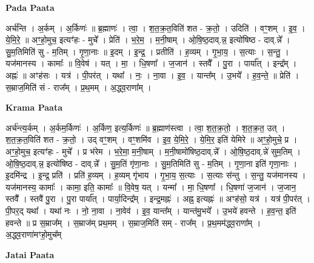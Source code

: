 \documentclass[17pt]{extarticle}
\begin{document}
\textbf{Pada Paata} \newline

अर्च॑न्ति । अ॒र्कम् । अ॒र्किणः॑ ॥ ब्र॒ह्माणः॑ । त्वा॒ । श॒त॒क्र॒त॒विति॑ शत - क्र॒तो॒ । उदिति॑ । वꣳ॒॒शम् । इ॒व॒ । ये॒मि॒रे॒ ॥ अꣳ॒॒हो॒मुच॒ इत्यꣳ॑हः - मुचे᳚ । प्रेति॑ । भ॒रे॒म॒ । म॒नी॒षाम् । ओ॒षि॒ष्ठ॒दाव्.न्न॒ इत्यो॑षिष्ठ - दाव्.न्ने᳚ । सु॒म॒तिमिति॑ सु - म॒तिम् । गृ॒णा॒नाः ॥ इ॒दम् । इ॒न्द्र॒ । प्रतीति॑ । ह॒व्यम् । गृ॒भा॒य॒ । स॒त्याः । स॒न्तु॒ । यज॑मानस्य । कामाः᳚ ॥ वि॒वेष॑ । यत् । मा॒ । धि॒षणा᳚ । ज॒जान॑ । स्तवै᳚ । पु॒रा । पार्या᳚त् । इन्द्र᳚म् । अह्नः॑ ॥ अꣳह॑सः । यत्र॑ । पी॒पर॑त् । यथा᳚ । नः॒ । ना॒वा । इ॒व॒ । यान्त᳚म् । उ॒भये᳚ । ह॒व॒न्ते॒ ॥ प्रेति॑ । स॒म्राज॒मिति॑ सं - राज᳚म् । प्र॒थ॒मम् । अ॒द्ध्व॒राणा᳚म् ।  \newline


\textbf{Krama Paata} \newline

अर्च॑न्त्य॒र्कम् । अ॒र्कम॒र्किणः॑ । अ॒र्किण॒ इत्य॒र्किणः॑ ॥ ब्र॒ह्माण॑स्त्वा । त्वा॒ श॒त॒क्र॒तो॒ । श॒त॒क्र॒त॒ उत् । श॒त॒क्र॒त॒विति॑ शत - क्र॒तो॒ । उद् वꣳ॒॒शम् । वꣳ॒॒शमि॑व । इ॒व॒ ये॒मि॒रे॒ । ये॒मि॒र॒ इति॑ येमिरे ॥ अꣳ॒॒हो॒मुचे॒ प्र । अꣳ॒॒हो॒मुच॒ इत्यꣳ॑हः - मुचे᳚ । प्र भ॑रेम । भ॒रे॒मा॒ म॒नी॒षाम् । म॒नी॒षामो॑षिष्ठ॒दाव्.न्ने᳚ । ओ॒षि॒ष्ठ॒दाव्.न्ने॑ सुम॒तिम् । ओ॒षि॒ष्ठ॒दाव्.न्न॒ इत्यो॑षिष्ठ - दाव्.न्ने᳚ । सु॒म॒तिं गृ॑णा॒नाः । सु॒म॒तिमिति॑ सु - म॒तिम् । गृ॒णा॒ना इति॑ गृणा॒नाः । इ॒दमि॑न्द्र । इ॒न्द्र॒ प्रति॑ । प्रति॑ ह॒व्यम् । ह॒व्यम् गृ॑भाय । गृ॒भा॒य॒ स॒त्याः । स॒त्याः स॑न्तु । स॒न्तु॒ यज॑मानस्य । यज॑मानस्य॒ कामाः᳚ । कामा॒ इति॒ कामाः᳚ ॥ वि॒वेष॒ यत् । यन्मा᳚ । मा॒ धि॒षणा᳚ । धि॒षणा॑ ज॒जान॑ । ज॒जान॒ स्तवै᳚ । स्तवै॑ पु॒रा । पु॒रा पार्या᳚त् । पार्या॒दिन्द्र᳚म् । इन्द्र॒मह्नः॑ । अह्न॒ इत्यह्नः॑ ॥ अꣳह॑सो॒ यत्र॑ । यत्र॑ पी॒पर॑त् । पी॒पर॒द् यथा᳚ । यथा॑ नः । नो॒ ना॒वा । ना॒वेव॑ । इ॒व॒ यान्त᳚म् । यान्त॑मु॒भये᳚ । उ॒भये॑ हवन्ते । ह॒व॒न्त॒ इति॑ हवन्ते ॥ प्र स॒म्राज᳚म् । स॒म्राज॑म् प्रथ॒मम् । स॒म्राज॒मिति॑ सम् - राज᳚म् । प्र॒थ॒मम॑द्ध्व॒राणा᳚म् । अ॒द्ध्व॒राणा॑मꣳहो॒मुच᳚म् \newline

\textbf{Jatai Paata} \newline
\end{document}
